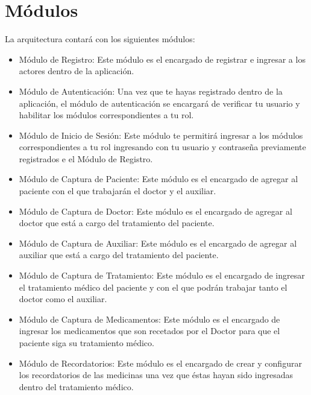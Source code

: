 \section{Módulos}
La arquitectura contará con los siguientes módulos:
\begin{itemize}
	\item Módulo de Registro: Este módulo es el encargado de registrar e ingresar a los actores dentro de la aplicación. 
	
	
	\item Módulo de Autenticación: Una vez que te hayas registrado dentro de la aplicación, el módulo de autenticación se encargará de verificar tu usuario y habilitar los módulos correspondientes a tu rol.
	
	\item Módulo de Inicio de Sesión: Este módulo te permitirá ingresar a los módulos correspondientes a tu rol ingresando con tu usuario y contraseña previamente registrados e el Módulo de Registro.
	
	 
	\item Módulo de Captura de Paciente: Este módulo es el encargado de agregar al paciente con el que trabajarán el doctor y el auxiliar.
	
	\item Módulo de Captura de Doctor: Este módulo es el encargado de agregar al doctor que está a cargo del tratamiento del paciente.
	
	\item Módulo de Captura de Auxiliar: Este módulo es el encargado de agregar al auxiliar que está a cargo del tratamiento del paciente.
	
	
	\item Módulo de Captura de Tratamiento: Este módulo es el encargado de ingresar el tratamiento médico del paciente y con el que podrán trabajar tanto el doctor como el auxiliar. 

	\item Módulo de Captura de Medicamentos: Este módulo es el encargado de ingresar los medicamentos que son recetados por el Doctor para que el paciente siga su tratamiento médico.
	
	\item Módulo de Recordatorios: Este módulo es el encargado de crear y configurar los recordatorios de las medicinas una vez que éstas hayan sido ingresadas dentro del tratamiento médico.
	

\end{itemize}
